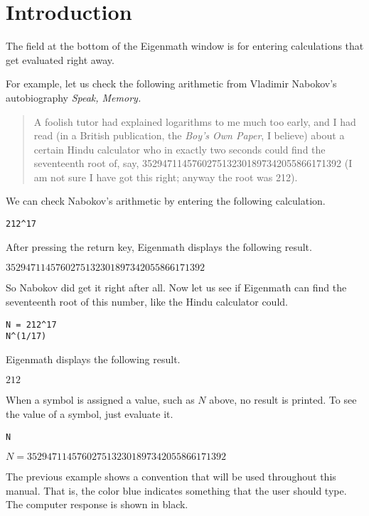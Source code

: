 
\section{Introduction}
The field at the bottom of the Eigenmath window is for entering
calculations that get evaluated right away.

\begin{center}
\end{center}

For example, let us check the following
arithmetic from Vladimir Nabokov's autobiography {\it Speak, Memory.}

\begin{quote}
A foolish tutor had explained logarithms to me much too early, and I had
read (in a British publication, the {\it Boy's Own Paper}, I believe)
about a certain Hindu calculator who in exactly two seconds could find the
seventeenth root of, say,
3529471145760275132301897342055866171392
(I am not sure I have got this right; anyway the root was 212).
\end{quote}

We can check Nabokov's arithmetic by entering the following calculation.

\begin{Verbatim}[formatcom=\color{blue}]
212^17
\end{Verbatim}

After pressing the return key, Eigenmath displays the following result.

$3529471145760275132301897342055866171392$

So Nabokov did get it right after all.
Now let us see if Eigenmath can find the
seventeenth root of this number, like the Hindu calculator could.

\begin{Verbatim}[formatcom=\color{blue}]
N = 212^17
N^(1/17)
\end{Verbatim}

Eigenmath displays the following result.

$212$

When a symbol is assigned a value, such as $N$ above,
no result is printed.
To see the value of a symbol, just evaluate it.

\begin{Verbatim}[formatcom=\color{blue}]
N
\end{Verbatim}

$N=3529471145760275132301897342055866171392$

The previous example shows a convention that will be used throughout
this manual.
That is, the color blue indicates something that the user should type.
The computer response is shown in black.
